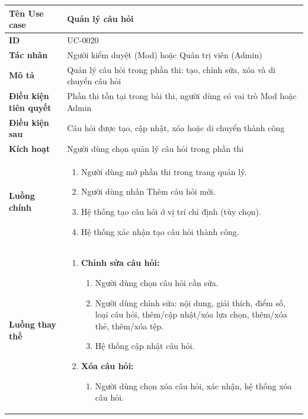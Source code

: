 {
\renewcommand{\arraystretch}{1.5}

\begin{tabularx}{\textwidth}{|>{\raggedright\arraybackslash}X|>{\raggedright\arraybackslash}X|}
\hline
\textbf{Tên Use case} & Quản lý câu hỏi \\
\hline
\textbf{ID} & UC-0020 \\
\hline
\textbf{Tác nhân} & Người kiểm duyệt (Mod) hoặc Quản trị viên (Admin) \\
\hline
\textbf{Mô tả} & Quản lý câu hỏi trong phần thi: tạo, chỉnh sửa, xóa và di chuyển câu hỏi \\
\hline
\textbf{Điều kiện tiên quyết} & Phần thi tồn tại trong bài thi, người dùng có vai trò Mod hoặc Admin \\
\hline
\textbf{Điều kiện sau} & Câu hỏi được tạo, cập nhật, xóa hoặc di chuyển thành công \\
\hline
\textbf{Kích hoạt} & Người dùng chọn quản lý câu hỏi trong phần thi \\
\hline
\textbf{Luồng chính} &
\begin{enumerate}
    \item Người dùng mở phần thi trong trang quản lý.
    \item Người dùng nhấn Thêm câu hỏi mới.
    \item Hệ thống tạo câu hỏi ở vị trí chỉ định (tùy chọn).
    \item Hệ thống xác nhận tạo câu hỏi thành công.
\end{enumerate} \\
\hline
\textbf{Luồng thay thế} &
\begin{enumerate}
    \item \textbf{Chỉnh sửa câu hỏi:}
    \begin{enumerate}
        \item[2A.] Người dùng chọn câu hỏi cần sửa.
        \item[3A.] Người dùng chỉnh sửa: nội dung, giải thích, điểm số, loại câu hỏi, thêm/cập nhật/xóa lựa chọn, thêm/xóa thẻ, thêm/xóa tệp.
        \item[4A.] Hệ thống cập nhật câu hỏi.
    \end{enumerate}
    \item \textbf{Xóa câu hỏi:}
    \begin{enumerate}
        \item[2B.] Người dùng chọn xóa câu hỏi, xác nhận, hệ thống xóa câu hỏi.
    \end{enumerate}

\end{enumerate}
\end{tabularx}}
